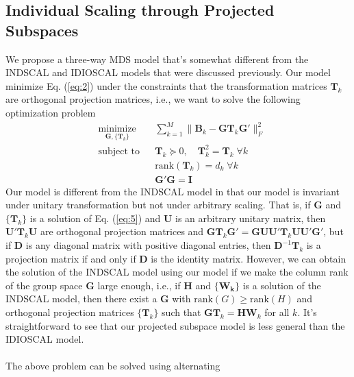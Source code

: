 \documentclass[11pt]{asaproc}
\begin{document}
\subsection{Individual Scaling through Projected Subspaces}
\label{sec:indiv-scal-thro}
We propose a three-way MDS model that's somewhat different from the
INDSCAL and IDIOSCAL models that were discussed previously. Our model
minimize Eq. (\ref{eq:2}) under the constraints that the
transformation matrices $\mathbf{T}_k$ are orthogonal projection
matrices, i.e., we want to solve the following optimization problem
\begin{equation}
  \label{eq:5}
	\begin{aligned}
	& \underset{\mathbf{G}, \{\mathbf{T}_k\}}{\text{minimize}}
	& & \sum_{k=1}^{M} \| \mathbf{B}_k - \mathbf{G}
\mathbf{T}_k \mathbf{G}' \|_F^2 \\
	& \text{subject to}
	& & \mathbf{T}_k \succeq 0, \quad \mathbf{T}_k^2 = \mathbf{T}_k \;
    \forall k\\
    & & & \mathrm{rank}(\mathbf{T}_k) = d_k \; \forall k \\
	&&& \mathbf{G}' \mathbf{G} = \mathbf{I}
	\end{aligned}
\end{equation}
Our model is different from the INDSCAL model in that our model is
invariant under unitary transformation but not under arbitrary
scaling. That is, if $\mathbf{G}$ and $\{\mathbf{T}_k\}$ is a solution
of Eq. (\ref{eq:5}) and $\mathbf{U}$ is an
arbitrary unitary matrix, then $\mathbf{U}' \mathbf{T}_k \mathbf{U}$
are orthogonal projection matrices and $\mathbf{G} \mathbf{T}_k
\mathbf{G}' = \mathbf{G} \mathbf{U} \mathbf{U}' \mathbf{T}_k
\mathbf{U} \mathbf{U}' \mathbf{G}'$, but if $\mathbf{D}$ is any diagonal matrix
with positive diagonal entries, then $\mathbf{D}^{-1} \mathbf{T}_k$ is
a projection matrix if and only if $\mathbf{D}$ is the identity
matrix. However, we can obtain the solution of the INDSCAL model using
our model if we make the column rank of the group space $\mathbf{G}$ large enough,
i.e., if $\mathbf{H}$ and $\{\mathbf{W_k}\}$ is a solution of the
INDSCAL model, then there exist a $\mathbf{G}$ with $\mathrm{rank}(G)
\geq \mathrm{rank}(H)$ and orthogonal projection matrices $\{\mathbf{T}_k\}$
such that $\mathbf{G}\mathbf{T}_k = \mathbf{H}\mathbf{W}_k$ for all
$k$. It's straightforward to see that our projected subspace
model is less general than the IDIOSCAL model. \\ \\
%
%
\noindent The above problem can be solved using alternating
\end{document}
